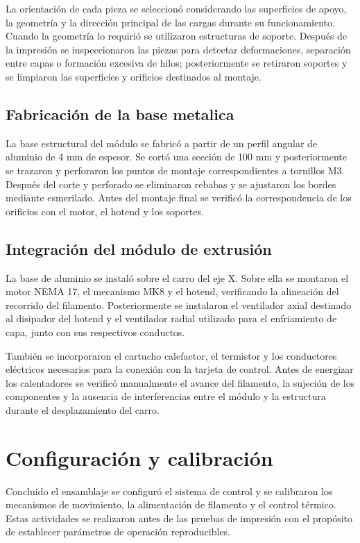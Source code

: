 La orientación de cada pieza se seleccionó considerando las superficies de apoyo, la geometría y la dirección principal de las cargas durante su funcionamiento. Cuando la geometría lo requirió se utilizaron estructuras de soporte. Después de la impresión se inspeccionaron las piezas para detectar deformaciones, separación entre capas o formación excesiva de hilos; posteriormente se retiraron soportes y se limpiaron las superficies y orificios destinados al montaje.



\subsection{Fabricación de la base metalica}

La base estructural del módulo se fabricó a partir de un perfil angular de aluminio de 4 mm de espesor. Se cortó una sección de 100 mm y posteriormente se trazaron y perforaron los puntos de montaje correspondientes a tornillos M3. Después del corte y perforado se eliminaron rebabas y se ajustaron los bordes mediante esmerilado. Antes del montaje final se verificó la correspondencia de los orificios con el motor, el hotend y los soportes.

\subsection{Integración del módulo de extrusión }

La base de aluminio se instaló sobre el carro del eje X. Sobre ella se montaron el motor NEMA 17, el mecanismo MK8 y el hotend, verificando la alineación del recorrido del filamento. Posteriormente se instalaron el ventilador axial destinado al disipador del hotend y el ventilador radial utilizado para el enfriamiento de capa, junto con sus respectivos conductos.

También se incorporaron el cartucho calefactor, el termistor y los conductores eléctricos necesarios para la conexión con la tarjeta de control. Antes de energizar los calentadores se verificó manualmente el avance del filamento, la sujeción de los componentes y la ausencia de interferencias entre el módulo y la estructura durante el desplazamiento del carro.

\section{Configuración y calibración}

Concluido el ensamblaje se configuró el sistema de control y se calibraron los mecanismos de movimiento, la alimentación de filamento y el control térmico. Estas actividades se realizaron antes de las pruebas de impresión con el propósito de establecer parámetros de operación reproducibles.

